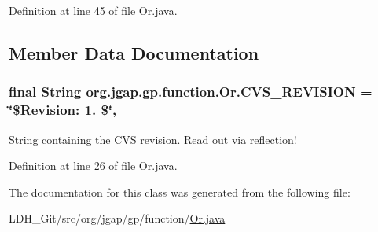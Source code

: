 Definition at line 45 of file Or.\-java.



\subsection{Member Data Documentation}
\hypertarget{classorg_1_1jgap_1_1gp_1_1function_1_1_or_ab0cd66f26e1a633b428cc62e7355d3b8}{
\subsubsection[{C\-V\-S\-\_\-\-R\-E\-V\-I\-S\-I\-O\-N}]{\setlength{\rightskip}{0pt plus 5cm}final String org.\-jgap.\-gp.\-function.\-Or.\-C\-V\-S\-\_\-\-R\-E\-V\-I\-S\-I\-O\-N = \char`\"{}\$Revision\-: 1. \$\char`\"{}\hspace{0.3cm}{\ttfamily [static]}, {\ttfamily [private]}}}\label{classorg_1_1jgap_1_1gp_1_1function_1_1_or_ab0cd66f26e1a633b428cc62e7355d3b8}
String containing the C\-V\-S revision. Read out via reflection! 

Definition at line 26 of file Or.\-java.



The documentation for this class was generated from the following file\-:\begin{DoxyCompactItemize}
\item 
L\-D\-H\-\_\-\-Git/src/org/jgap/gp/function/\hyperlink{_or_8java}{Or.\-java}\end{DoxyCompactItemize}
